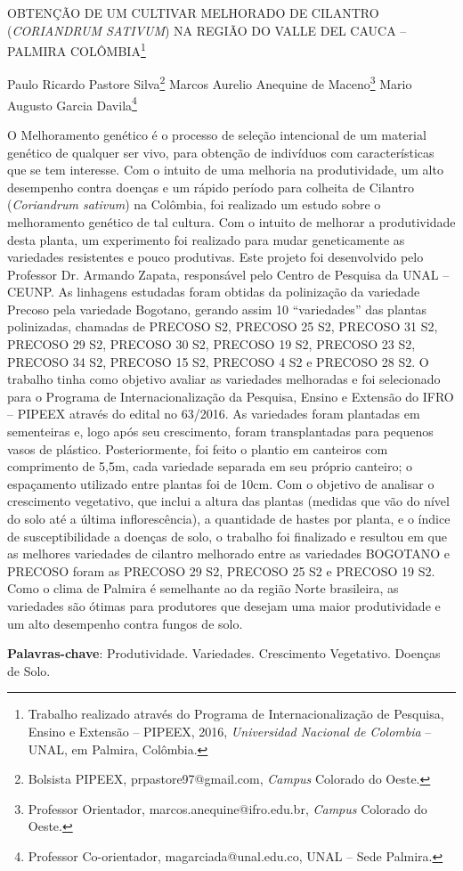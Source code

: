 \documentclass[article,12pt,onesidea,4paper,english,brazil]{abntex2}
\begin{document}
	
	
	\frenchspacing 
	
	\begin{center}
		\LARGE OBTENÇÃO DE UM CULTIVAR MELHORADO DE CILANTRO (\textit{CORIANDRUM SATIVUM}) NA REGIÃO DO VALLE DEL CAUCA – PALMIRA COLÔMBIA\footnote{Trabalho realizado através do Programa de Internacionalização de Pesquisa, Ensino e Extensão – PIPEEX, 2016, \textit{Universidad Nacional de Colombia} – UNAL, em Palmira, Colômbia.}
		
		\normalsize
		Paulo Ricardo Pastore Silva\footnote{Bolsista PIPEEX, prpastore97@gmail.com, \textit{Campus} Colorado do Oeste.} 
		Marcos Aurelio Anequine de Maceno\footnote{Professor Orientador, marcos.anequine@ifro.edu.br, \textit{Campus} Colorado do Oeste.} 
		Mario Augusto Garcia Davila\footnote{Professor Co-orientador, magarciada@unal.edu.co, UNAL – Sede Palmira.}
	\end{center}
	
	\noindent O Melhoramento genético é o processo de seleção intencional de um material
	genético de qualquer ser vivo, para obtenção de indivíduos com características que
	se tem interesse. Com o intuito de uma melhoria na produtividade, um alto
	desempenho contra doenças e um rápido período para colheita de Cilantro
	(\textit{Coriandrum sativum}) na Colômbia, foi realizado um estudo sobre o melhoramento
	genético de tal cultura. Com o intuito de melhorar a produtividade desta planta, um
	experimento foi realizado para mudar geneticamente as variedades resistentes e
	pouco produtivas. Este projeto foi desenvolvido pelo Professor Dr. Armando Zapata,
	responsável pelo Centro de Pesquisa da UNAL – CEUNP. As linhagens estudadas
	foram obtidas da polinização da variedade Precoso pela variedade Bogotano,
	gerando assim 10 “variedades” das plantas polinizadas, chamadas de PRECOSO
	S2, PRECOSO 25 S2, PRECOSO 31 S2, PRECOSO 29 S2, PRECOSO 30 S2,	PRECOSO 19 S2, PRECOSO 23 S2, PRECOSO 34 S2, PRECOSO 15 S2, PRECOSO 4 S2 e PRECOSO 28 S2. O trabalho tinha como objetivo avaliar as	variedades melhoradas e foi selecionado para o Programa de Internacionalização da Pesquisa, Ensino e Extensão do IFRO – PIPEEX através do edital no 63/2016. 
	As variedades foram plantadas em sementeiras e, logo após seu crescimento, foram
	transplantadas para pequenos vasos de plástico. Posteriormente, foi feito o plantio
	em canteiros com comprimento de 5,5m, cada variedade separada em seu próprio
	canteiro; o espaçamento utilizado entre plantas foi de 10cm. Com o objetivo de
	analisar o crescimento vegetativo, que inclui a altura das plantas (medidas que vão
	do nível do solo até a última inflorescência), a quantidade de hastes por planta, e o	índice de susceptibilidade a doenças de solo, o trabalho foi finalizado e resultou em que as melhores variedades de cilantro melhorado entre as variedades BOGOTANO e PRECOSO foram as PRECOSO 29 S2, PRECOSO 25 S2 e PRECOSO 19 S2.
	Como o clima de Palmira é semelhante ao da região Norte brasileira, as variedades
	são ótimas para produtores que desejam uma maior produtividade e um alto
	desempenho contra fungos de solo.
	
	\vspace{\onelineskip}
	
	\noindent
	\textbf{Palavras-chave}: Produtividade. Variedades. Crescimento Vegetativo. Doenças de Solo.
	
\end{document}
